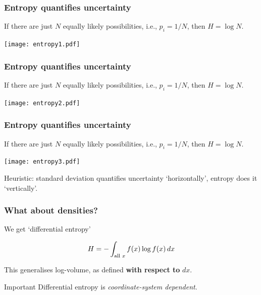 \documentclass{beamer}
\begin{document}
\begin{frame}
\frametitle{Entropy quantifies uncertainty}
If there are just $N$ equally likely possibilities,
i.e., $p_i = 1/N$, then $H = \log N$. \vspace{0.5em}

\begin{center}
\texttt{[image: entropy1.pdf]}
\end{center}

\end{frame}


\begin{frame}
\frametitle{Entropy quantifies uncertainty}
If there are just $N$ equally likely possibilities,
i.e., $p_i = 1/N$, then $H = \log N$. \vspace{0.5em}

\begin{center}
\texttt{[image: entropy2.pdf]}
\end{center}

\end{frame}

\begin{frame}
\frametitle{Entropy quantifies uncertainty}
If there are just $N$ equally likely possibilities,
i.e., $p_i = 1/N$, then $H = \log N$. \vspace{0.5em}

\begin{center}
\texttt{[image: entropy3.pdf]}
\end{center}

Heuristic: standard deviation quantifies uncertainty `horizontally',
entropy does it `vertically'.

\end{frame}


\begin{frame}
\frametitle{What about densities?}
We get `differential entropy'

\begin{align}
H = - \int_{\textnormal{all }x} f(x) \log f(x) \, dx
\end{align}

This generalises log-volume, as defined {\bf with respect to} $dx$.

\begin{alertblock}{Important}
Differential entropy is {\em coordinate-system dependent}.
\end{alertblock}

\end{frame}
\end{document}
